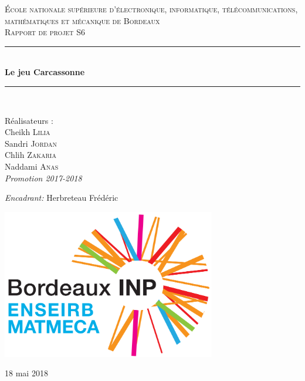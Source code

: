 \documentclass[12pt]{article}
\newcommand{\HRule}{\rule{\linewidth}{0.5mm}}
\begin{document}
\begin{titlepage}
  \begin{sffamily}
  \begin{center}


    \textsc{\LARGE École nationale supérieure d'électronique, informatique, télécommunications, mathématiques et mécanique de Bordeaux}\\[2cm]

    \textsc{\Large Rapport de projet S6 }\\[1.5cm]

    \HRule \\[0.4cm]
    { \huge \bfseries Le jeu Carcassonne\\[0.4cm] }

    \HRule \\[2cm]
    \begin{minipage}{0.4\textwidth}
      \begin{flushleft} \large
      \textnormal{Réalisateurs :}\\
        Cheikh \textsc{Lilia}\\
          Sandri \textsc{Jordan}\\
            Chlih \textsc{Zakaria}\\
              Naddami \textsc{Anas}\\
        \textit{Promotion 2017-2018}\\
      \end{flushleft}
    \end{minipage}
    \begin{minipage}{0.4\textwidth}
      \begin{flushright} \large
              \emph{Encadrant: } Herbreteau Frédéric \textsc{}
              
      \end{flushright}
    \end{minipage}
    \newline
    \begin{center}
    \includegraphics[width=0.7\textwidth]{logo.PNG}
     \end{center}

    \vfill

    {\large 18 mai 2018 }

  \end{center}
  \end{sffamily}
\end{titlepage}
\newpage
\tableofcontents
\newpage
\end{document}
